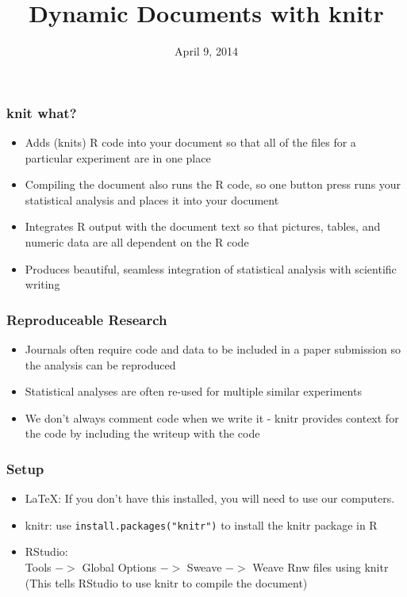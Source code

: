 \documentclass{beamer}\usepackage[]{graphicx}\usepackage[]{color}
\title[Dynamic Documents with knitr]{Dynamic Documents with knitr}
\date{April 9, 2014}
\institute[ISU]{Iowa State University}
\begin{document}

\begin{frame}
    \maketitle
\end{frame}


\begin{frame}
\frametitle{knit what?}
\begin{itemize}
\item Adds (knits) R code into your document so that all of the files for a particular experiment are in one place\medskip
\item Compiling the document also runs the R code, so one button press runs your statistical analysis and places it into your document\medskip
\item Integrates R output with the document text so that pictures, tables, and numeric data are all dependent on the R code\medskip
\item Produces beautiful, seamless  integration of statistical analysis with scientific writing
\end{itemize}
\end{frame}


\begin{frame}
\frametitle{Reproduceable Research}
\begin{itemize}
\item Journals often require code and data to be included in a paper submission so the analysis can be reproduced\medskip
\item Statistical analyses are often re-used for multiple similar experiments\medskip
\item We don't always comment code when we write it - knitr provides context for the code by including the writeup with the code
\end{itemize}
\end{frame}


\begin{frame}
\frametitle{Setup}
\begin{itemize}
\item LaTeX: If you don't have this installed, you will need to use our computers.\medskip
\item knitr: use \texttt{install.packages("knitr")} to install the knitr package in R\medskip
\item RStudio: \\{\footnotesize Tools $-\!\!\!>$ Global Options $-\!\!\!>$ Sweave $-\!\!\!>$ Weave Rnw files using knitr}\\ (This tells RStudio to use knitr to compile the document)
\end{itemize}
\end{frame}
\end{document}

